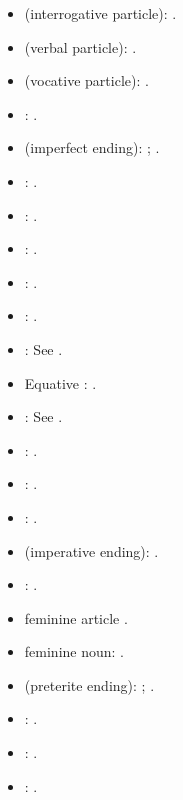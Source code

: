 \begin{itemize}
\item{} (interrogative particle): \textcite[\S\S 23, 196]{evans_grammar_1964}.
\item{} (verbal particle): \textcite[\S\S 23, 6, 192]{evans_grammar_1964}.
\item{} (vocative particle): \textcite[\S 19]{evans_grammar_1964}.
\item{}: \textcite[\S 20]{evans_grammar_1964}.
\item{} (imperfect ending): \textcite[\S 21]{evans_grammar_1964}; \textcite[42--45]{van_development14}.
\item{}: \textcite[\S 249]{evans_grammar_1964}.
\item{}: \textcite[\S 20]{evans_grammar_1964}.
\item{}: \textcite[\S 20]{evans_grammar_1964}.
\item{}: \textcite[\S 20]{evans_grammar_1964}.
\item{}: \textcite[\S 20]{evans_grammar_1964}.
\item{}: See .
\item Equative : \textcite[\S\S 22, 43]{evans_grammar_1964}.
\item{}: See .
\item{}: \textcite[\S 20]{evans_grammar_1964}.
\item{}: \textcite[\S 20]{evans_grammar_1964}.
\item{}: \textcite[\S 20]{evans_grammar_1964}.
\item{} (imperative ending): \textcite[\S 21]{evans_grammar_1964}.
\item{}: \textcite[\S 20]{evans_grammar_1964}.
\item feminine article \textcite[\S 19]{evans_grammar_1964}.
\item feminine noun: \textcite[\S\S 19, 22]{evans_grammar_1964}.
\item{} (preterite ending): \textcite[\S 21]{evans_grammar_1964}; \textcite[50--51]{van_development14}.
\item{}: \textcite[\S 20]{evans_grammar_1964}.
\item{}: \textcite[\S 20]{evans_grammar_1964}.
\item{}: \textcite[\S 20]{evans_grammar_1964}.

\end{itemize}
